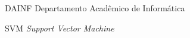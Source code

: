 \begin{siglas}
  \item[DAINF] Departamento Acadêmico de Informática
  \item[SVM] \textit{Support Vector Machine}
\end{siglas}
